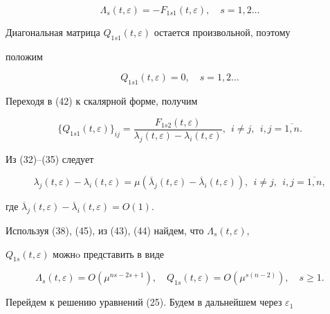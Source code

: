 \begin{pf}
\begin{equation}


\Lambda_{s}(t,\varepsilon)=


-F_{1s1}(t,\varepsilon),\quad s=1,2 \dotsc


\end{equation}


Диагональная матрица $Q_{1s1}(t,\varepsilon)$ остается произвольной, поэтому


положим


$$


Q_{1s1}(t,\varepsilon)=0,\quad s=1,2 \dotsc


$$


Переходя в (42) к скалярной форме, получим


\begin{equation}


\{Q_{1s1}(t,\varepsilon)\}_{ij}=


\frac{F_{1s2}(t,\varepsilon)}{\lambda_{j}


(t,\varepsilon)-\lambda_{i}(t,\varepsilon)},\ \ i\neq j,\ \ i,j=\overline{1,n}.


\end{equation}


Из (32)--(35) следует


\begin{equation}


\lambda_{j}(t,\varepsilon)-\lambda_{i}(t,\varepsilon)=\mu


(\overline{\lambda}_{j}(t,\varepsilon)-


\overline{\lambda}_{i}(t,\varepsilon)),\ \ i\neq j,\ \ i,j=\overline{1,n},


\end{equation}


где $\overline{\lambda}_{j}(t,\varepsilon)-


\overline{\lambda}_{i}(t,\varepsilon)=O(1)$.


Используя (38), (45), из (43), (44) найдем, что $\Lambda_{s}(t,\varepsilon)$,


$Q_{1s} (t,\varepsilon)$ можнo представить в виде


$$


\Lambda_{s}(t,\varepsilon)=O(\mu^{ns-2s+1}),\quad


Q_{1s} (t,\varepsilon)=O(\mu^{s(n-2)}),\quad s \geq 1.


$$





Перейдем к решению уравнений (25). Будем в дальнейшем через $\varepsilon_{1}$



\end{pf}
